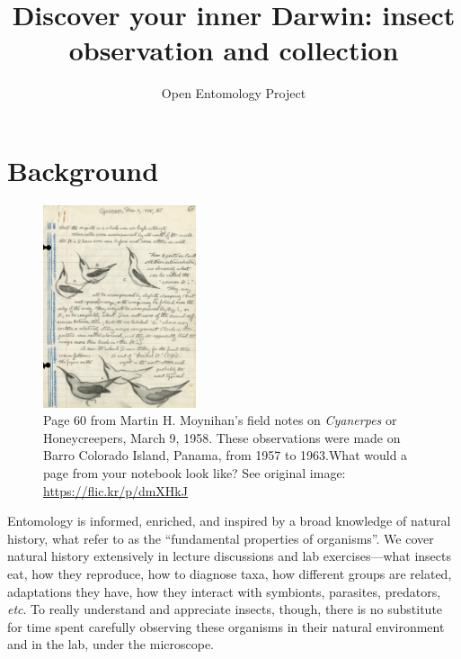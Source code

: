 \documentclass[letterpaper, 11pt]{article}
\title{Discover your inner Darwin: insect observation and collection}
\author{Open Entomology Project}
\begin{document}
\cleanlookdateon %
\maketitle
\thispagestyle{fancy}

\section*{Background}
\begin{figure}
  \vspace{-24pt}
  \begin{center}
    \includegraphics[width=0.4\textwidth]{Moynihan}%
  \end{center}
  \vspace{-17pt}
  \caption*{Page 60 from Martin H. Moynihan's field notes on \textit{Cyanerpes} or Honeycreepers, March 9, 1958. These observations were made on Barro Colorado Island, Panama, from 1957 to 1963.What would a page from your notebook look like? See original image: \url{https://flic.kr/p/dmXHkJ}}
  \vspace{-30pt}
\end{figure}

Entomology is informed, enriched, and inspired by a broad knowledge of natural history, what \cite{Tewksbury01042014} refer to as the ``fundamental properties of organisms''. We cover natural history extensively in lecture discussions and lab exercises---what insects eat, how they reproduce, how to diagnose taxa, how different groups are related, adaptations they have, how they interact with symbionts, parasites, predators, \textit{etc}. To really understand and appreciate insects, though, there is no substitute for time spent carefully observing these organisms in their natural environment and in the lab, under the microscope. \\
\end{document}
